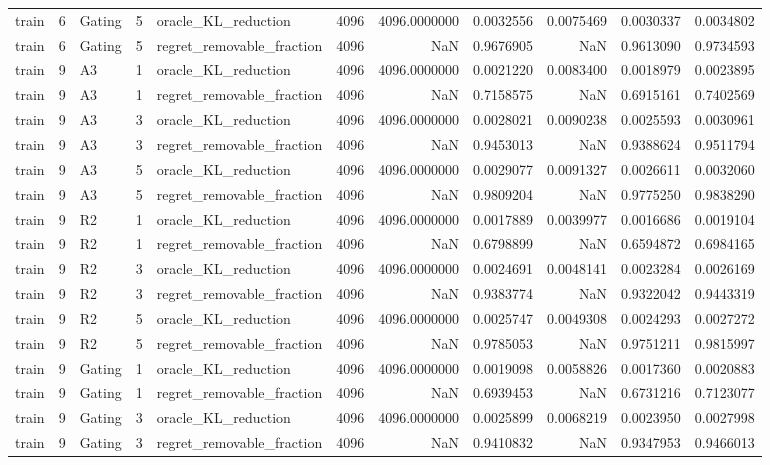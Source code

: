 \begin{tabular}{lrlrlrrrrrr}
train & 6 & Gating & 5 & oracle_KL_reduction & 4096 & 4096.0000000 & 0.0032556 & 0.0075469 & 0.0030337 & 0.0034802 \\
train & 6 & Gating & 5 & regret_removable_fraction & 4096 & NaN & 0.9676905 & NaN & 0.9613090 & 0.9734593 \\
train & 9 & A3 & 1 & oracle_KL_reduction & 4096 & 4096.0000000 & 0.0021220 & 0.0083400 & 0.0018979 & 0.0023895 \\
train & 9 & A3 & 1 & regret_removable_fraction & 4096 & NaN & 0.7158575 & NaN & 0.6915161 & 0.7402569 \\
train & 9 & A3 & 3 & oracle_KL_reduction & 4096 & 4096.0000000 & 0.0028021 & 0.0090238 & 0.0025593 & 0.0030961 \\
train & 9 & A3 & 3 & regret_removable_fraction & 4096 & NaN & 0.9453013 & NaN & 0.9388624 & 0.9511794 \\
train & 9 & A3 & 5 & oracle_KL_reduction & 4096 & 4096.0000000 & 0.0029077 & 0.0091327 & 0.0026611 & 0.0032060 \\
train & 9 & A3 & 5 & regret_removable_fraction & 4096 & NaN & 0.9809204 & NaN & 0.9775250 & 0.9838290 \\
train & 9 & R2 & 1 & oracle_KL_reduction & 4096 & 4096.0000000 & 0.0017889 & 0.0039977 & 0.0016686 & 0.0019104 \\
train & 9 & R2 & 1 & regret_removable_fraction & 4096 & NaN & 0.6798899 & NaN & 0.6594872 & 0.6984165 \\
train & 9 & R2 & 3 & oracle_KL_reduction & 4096 & 4096.0000000 & 0.0024691 & 0.0048141 & 0.0023284 & 0.0026169 \\
train & 9 & R2 & 3 & regret_removable_fraction & 4096 & NaN & 0.9383774 & NaN & 0.9322042 & 0.9443319 \\
train & 9 & R2 & 5 & oracle_KL_reduction & 4096 & 4096.0000000 & 0.0025747 & 0.0049308 & 0.0024293 & 0.0027272 \\
train & 9 & R2 & 5 & regret_removable_fraction & 4096 & NaN & 0.9785053 & NaN & 0.9751211 & 0.9815997 \\
train & 9 & Gating & 1 & oracle_KL_reduction & 4096 & 4096.0000000 & 0.0019098 & 0.0058826 & 0.0017360 & 0.0020883 \\
train & 9 & Gating & 1 & regret_removable_fraction & 4096 & NaN & 0.6939453 & NaN & 0.6731216 & 0.7123077 \\
train & 9 & Gating & 3 & oracle_KL_reduction & 4096 & 4096.0000000 & 0.0025899 & 0.0068219 & 0.0023950 & 0.0027998 \\
train & 9 & Gating & 3 & regret_removable_fraction & 4096 & NaN & 0.9410832 & NaN & 0.9347953 & 0.9466013 \\

\end{tabular}
